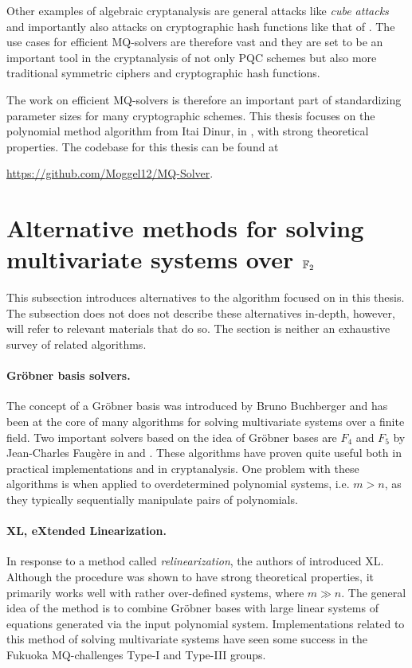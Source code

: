 Other examples of algebraic cryptanalysis are general attacks like \textit{cube attacks} \cite{Videau2011} and importantly also attacks on cryptographic hash functions like that of \cite{fse-2011-23547}. The use cases for efficient MQ-solvers are therefore vast and they are set to be an important tool in the cryptanalysis of not only PQC schemes but also more traditional symmetric ciphers and cryptographic hash functions. 

The work on efficient MQ-solvers is therefore an important part of standardizing parameter sizes for many cryptographic schemes. This thesis focuses on the polynomial method algorithm from Itai Dinur, in \cite{eurocrypt-2021-30841}, with strong theoretical properties. The codebase for this thesis can be found at 
\begin{center}
    \url{https://github.com/Moggel12/MQ-Solver}.
\end{center}

\section{Alternative methods for solving multivariate systems over $\mathbb{F}_2$}
This subsection introduces alternatives to the algorithm focused on in this thesis. The subsection does not does not describe these alternatives in-depth, however, will refer to relevant materials that do so. The section is neither an exhaustive survey of related algorithms.

\paragraph{Gröbner basis solvers.} The concept of a Gröbner basis was introduced by Bruno Buchberger and has been at the core of many algorithms for solving multivariate systems over a finite field. Two important solvers based on the idea of Gröbner bases are $F_4$ and $F_5$ by Jean-Charles Faugère in \cite{FAUGERE199961} and \cite{10.1145/780506.780516}. These algorithms have proven quite useful both in practical implementations and in cryptanalysis. One problem with these algorithms is when applied to overdetermined polynomial systems, i.e. $m > n$, as they typically sequentially manipulate pairs of polynomials. 

\paragraph{XL, eXtended Linearization.} In response to a method called \textit{relinearization}, the authors of \cite{eurocrypt-2000-2187} introduced XL. Although the procedure was shown to have strong theoretical properties, it primarily works well with rather over-defined systems, where $m \gg n$. The general idea of the method is to combine Gröbner bases with large linear systems of equations generated via the input polynomial system. Implementations related to this method of solving multivariate systems have seen some success in the Fukuoka MQ-challenges Type-I and Type-III groups. 

